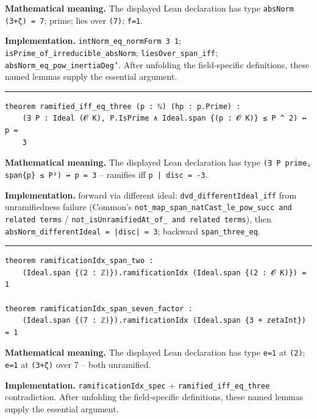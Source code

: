 \documentclass[UTF8,a4paper,11pt,fontset=fandol]{ctexart}
\theoremstyle{definition}
\newcommand{\statementsep}{\par\medskip\hrule\medskip}
\begin{document}
\noindent\textbf{Mathematical meaning.} The displayed Lean declaration has type \texttt{absNorm (3+ζ) = 7}; prime; lies over \texttt{(7)}; \texttt{f=1}.\par
\noindent\textbf{Implementation.} \texttt{intNorm\_\allowbreak{}eq\_\allowbreak{}normForm 3 1}; \texttt{isPrime\_\allowbreak{}of\_\allowbreak{}irreducible\_\allowbreak{}absNorm}; \texttt{liesOver\_\allowbreak{}span\_\allowbreak{}iff}; \texttt{absNorm\_\allowbreak{}eq\_\allowbreak{}pow\_\allowbreak{}inertiaDeg'}. After unfolding the field-specific definitions, these named lemmas supply the essential argument.\par
\statementsep
\begin{verbatim}
theorem ramified_iff_eq_three (p : ℕ) (hp : p.Prime) :
    (∃ P : Ideal (𝓞 K), P.IsPrime ∧ Ideal.span {(p : 𝓞 K)} ≤ P ^ 2) ↔ p =
    3
\end{verbatim}
\noindent\textbf{Mathematical meaning.} The displayed Lean declaration has type \texttt{(∃ P prime, span\{p\} ≤ P²) ↔ p = 3} -- ramifies iff \texttt{p | disc = -3}.\par
\noindent\textbf{Implementation.} forward via different ideal: \texttt{dvd\_\allowbreak{}differentIdeal\_\allowbreak{}iff} from unramifiedness failure (Common's \texttt{not\_\allowbreak{}map\_\allowbreak{}span\_\allowbreak{}natCast\_\allowbreak{}le\_\allowbreak{}pow\_\allowbreak{}succ and related terms} / \texttt{not\_\allowbreak{}isUnramifiedAt\_\allowbreak{}of\_\allowbreak{} and related terms}), then \texttt{absNorm\_\allowbreak{}differentIdeal = |disc| = 3}; backward \texttt{span\_\allowbreak{}three\_\allowbreak{}eq}.\par
\statementsep
\begin{verbatim}
theorem ramificationIdx_span_two :
    (Ideal.span {(2 : ℤ)}).ramificationIdx (Ideal.span {(2 : 𝓞 K)}) = 1

theorem ramificationIdx_span_seven_factor :
    (Ideal.span {(7 : ℤ)}).ramificationIdx (Ideal.span {3 + zetaInt}) = 1
\end{verbatim}
\noindent\textbf{Mathematical meaning.} The displayed Lean declaration has type \texttt{e=1} at \texttt{(2)}; \texttt{e=1} at \texttt{(3+ζ)} over 7 -- both unramified.\par
\noindent\textbf{Implementation.} \texttt{ramificationIdx\_\allowbreak{}spec} + \texttt{ramified\_\allowbreak{}iff\_\allowbreak{}eq\_\allowbreak{}three} contradiction. After unfolding the field-specific definitions, these named lemmas supply the essential argument.\par
\end{document}
